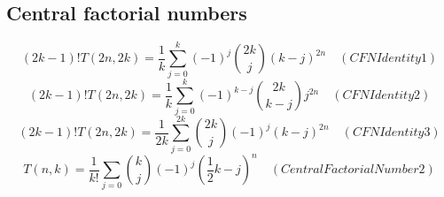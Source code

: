 \subsection{Central factorial numbers}\label{subsec:central-factorial-numbers}

\begin{equation*}
(2k-1) !T(2n,2k) = \frac{1}{k} \sum_{j=0}^{k} (-1)^j \binom{2k}{j} (k-j)^{2n} \quad
    (CFNIdentity1)
\end{equation*}
\begin{equation*}
(2k-1)
    !T(2n,2k) = \frac{1}{k} \sum_{j=0}^{k} (-1)^{k-j} \binom{2k}{k-j} j^{2n} \quad
    (CFNIdentity2)
\end{equation*}
\begin{equation*}
(2k-1)
    !T(2n, 2k) = \frac{1}{2k} \sum_{j=0}^{2k} \binom{2k}{j} (-1)^{j} (k-j)^{2n} \quad
    (CFNIdentity3)
\end{equation*}
\begin{equation*}
    T(n,k) = \frac{1}{k!} \sum_{j=0} \binom{k}{j} (-1)^{j} \left( \frac{1}{2}k - j \right)^{n} \quad
    (CentralFactorialNumber2)
\end{equation*}

